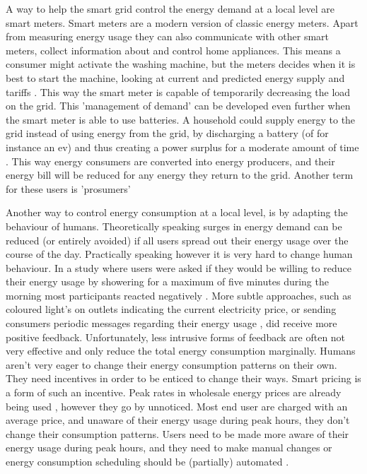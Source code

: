 A way to help the smart grid control the energy demand at a local level are smart meters. Smart meters are a modern version of classic energy meters. Apart from measuring energy usage they can also communicate with other smart meters, collect information about and control home appliances. This means a consumer might activate the washing machine, but the meters decides when it is best to start the machine, looking at current and predicted energy supply and tariffs  \cite{DepuruWangDevabhaktuni2011a}. This way the smart meter is capable of temporarily decreasing the load on the grid. This 'management of demand' can be developed even further when the smart meter is able to use batteries. A household could supply energy to the grid instead of using energy from the grid, by discharging a battery (of for instance an \ac{ev}) and thus creating a power surplus for a moderate amount of time \cite{MwasiluJustoKimEtAl2014}. This way energy consumers are converted into energy producers, and their energy bill will be reduced for any energy they return to the grid. Another term for these users is 'prosumers'

Another way to control energy consumption at a local level, is by adapting the behaviour of humans. Theoretically speaking surges in energy demand can be reduced (or entirely avoided) if all users spread out their energy usage over the course of the day. Practically speaking however it is very hard to change human behaviour. In a study where users were asked if they would be willing to reduce their energy usage by showering for a maximum of five minutes during the morning most participants reacted negatively \cite{GouldenBedwellRennick-EgglestoneEtAl2014}. More subtle approaches, such as coloured light's on outlets indicating the current electricity price, or sending consumers periodic messages regarding their energy usage \cite{AyresRasemanShih2012}, did receive more positive feedback. Unfortunately, less intrusive forms of feedback are often not very effective and only reduce the total energy consumption marginally. Humans aren’t very eager to change their energy consumption patterns on their own. They need incentives in order to be enticed to change their ways. Smart pricing is a form of such an incentive. Peak rates in wholesale energy prices are already being used \cite{SamadiMohsenian-RadSchoberEtAl2012}, however they go by unnoticed. Most end user are charged with an average price, and unaware of their energy usage during peak hours, they don’t change their consumption patterns. Users need to be made more aware of their energy usage during peak hours, and they need to make manual changes \cite{Mohsenian-RadLeon-Garcia2010} or energy consumption scheduling should be (partially) automated \cite{SamadiMohsenian-RadSchoberEtAl2012}.

